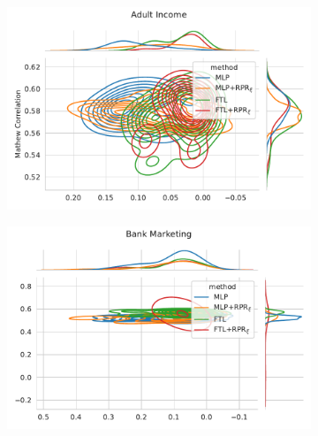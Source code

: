 \begin{figure}
\centering
\caption{Metric distribution optimizing MCC and Equal Opportunity in comparison with Redlining Penalty Regularization across multiple resample runs. Corresponding values available at Table~\ref{tab:complete_mcc_opportunity_rpr}.}
\label{fig:complete_mcc_opportunity_rpr}
\begin{subfigure}{.45\linewidth}
    \includegraphics[width=1\linewidth]{images/pareto_mcc_opportunity_adult_rpr.pdf}
\end{subfigure}
\begin{subfigure}{.45\linewidth}
    \includegraphics[width=1\linewidth]{images/pareto_mcc_opportunity_bank_rpr.pdf}
\end{subfigure}


\end{figure}
